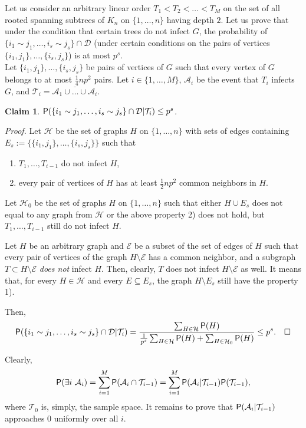 \documentclass[]{article}
\newtheorem{claim}[theorem]{Claim}
\begin{document}
Let us consider an arbitrary linear order $T_1<T_2<\ldots<T_M$ on the set of all rooted spanning subtrees of $K_n$ on $\{1,\ldots,n\}$ having depth $2$.  Let us prove that under the condition that certain trees do not infect $G$, the probability of $\{i_1\sim j_1,\ldots,i_s\sim j_s\}\cap\mathcal{D}$ (under certain conditions on the pairs of vertices $\{i_1,j_1\},\ldots,\{i_s,j_s\}$) is at most $p^s$.\\

Let $\{i_1,j_1\},\ldots,\{i_s,j_s\}$ be pairs of vertices of $G$ such that every vertex of $G$ belongs to at most $\frac{1}{4}np^2$ pairs. Let $i\in\{1,\ldots,M\}$, $\mathcal{A}_i$ be the event that $T_i$ infects $G$, and $\mathcal{T}_i=\overline{\mathcal{A}_1\cup\ldots\cup \mathcal{A}_i}$.

\begin{claim}
${\sf P}(\{i_1\sim j_1,\ldots,i_s\sim j_s\}\cap\mathcal{D}|\mathcal{T}_i)\leq p^s$.
\label{independence}
\end{claim}

{\it Proof.} Let $\mathcal{H}$ be the set of graphs $H$ on $\{1,\ldots,n\}$ with sets of edges containing $E_s:=\{\{i_1,j_1\},\ldots,\{i_s,j_s\}\}$ such that
\begin{enumerate}
\item $T_1,\ldots,T_{i-1}$ do not infect $H$,
\item every pair of vertices of $H$ has at least $\frac{1}{2}np^2$ common neighbors in $H$.
\end{enumerate} 
Let $\mathcal{H}_0$ be the set of graphs $H$ on $\{1,\ldots,n\}$ such that either $H\cup E_s$ does not equal to any graph from $\mathcal{H}$ or the above property 2) does not hold, but $T_1,\ldots,T_{i-1}$ still do not infect $H$.

Let $H$ be an arbitrary graph and $\mathcal{E}$ be a subset of the set of edges of $H$ such that every pair of vertices of the graph $H\setminus\mathcal{E}$ has a common neighbor, and a subgraph $T\subset H\setminus\mathcal{E}$ {\it does not} infect $H$. Then, clearly, $T$ does not infect $H\setminus\mathcal{E}$ as well. It means that, for every $H\in\mathcal{H}$ and every $E\subseteq E_s$, the graph $H\setminus E_s$ still have the property 1).

Then,
$$
 {\sf P}(\{i_1\sim j_1,\ldots,i_s\sim j_s\}\cap\mathcal{D}|\mathcal{T}_i)=\frac{\sum_{H\in\mathcal{H}}{\sf P}(H)}{\frac{1}{p^s}\sum_{H\in\mathcal{H}}{\sf P}(H)+\sum_{H\in\mathcal{H}_0}{\sf P}(H)}\leq p^s.\quad \Box
$$

Clearly,
$$
 {\sf P}(\exists i\,\,\mathcal{A}_i)=\sum_{i=1}^M {\sf P}(\mathcal{A}_i\cap\mathcal{T}_{i-1})=\sum_{i=1}^M {\sf P}(\mathcal{A}_i|\mathcal{T}_{i-1}){\sf P}(\mathcal{T}_{i-1}),
$$
where $\mathcal{T}_0$ is, simply, the sample space. It remains to prove that ${\sf P}(\mathcal{A}_i|\mathcal{T}_{i-1})$ approaches $0$ uniformly over all $i$.
\end{document}
